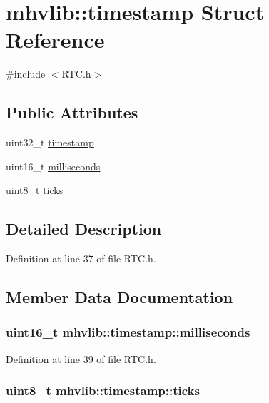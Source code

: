 \hypertarget{structmhvlib_1_1timestamp}{\section{mhvlib\-:\-:timestamp Struct Reference}
\label{structmhvlib_1_1timestamp}
}


{\ttfamily \#include $<$R\-T\-C.\-h$>$}

\subsection*{Public Attributes}
\begin{DoxyCompactItemize}
\item 
uint32\-\_\-t \hyperlink{structmhvlib_1_1timestamp_a901b5c2408fef1697c9e9073e3c25bc8}{timestamp}
\item 
uint16\-\_\-t \hyperlink{structmhvlib_1_1timestamp_ac9ebd91dc99e965759355eecb4fd599a}{milliseconds}
\item 
uint8\-\_\-t \hyperlink{structmhvlib_1_1timestamp_a545be33ab1394635c94db6f3b6bcf15a}{ticks}
\end{DoxyCompactItemize}


\subsection{Detailed Description}


Definition at line 37 of file R\-T\-C.\-h.



\subsection{Member Data Documentation}
\hypertarget{structmhvlib_1_1timestamp_ac9ebd91dc99e965759355eecb4fd599a}{
\subsubsection[{milliseconds}]{\setlength{\rightskip}{0pt plus 5cm}uint16\-\_\-t mhvlib\-::timestamp\-::milliseconds}}\label{structmhvlib_1_1timestamp_ac9ebd91dc99e965759355eecb4fd599a}


Definition at line 39 of file R\-T\-C.\-h.

\hypertarget{structmhvlib_1_1timestamp_a545be33ab1394635c94db6f3b6bcf15a}{
\subsubsection[{ticks}]{\setlength{\rightskip}{0pt plus 5cm}uint8\-\_\-t mhvlib\-::timestamp\-::ticks}}\label{structmhvlib_1_1timestamp_a545be33ab1394635c94db6f3b6bcf15a}


